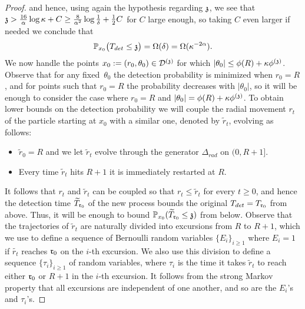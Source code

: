 \begin{proof}
and hence, using again the hypothesis regarding $\ss$, we see that $\ss>\frac{16}{\alpha}\log\kappa+C\geq \frac{8}{\alpha^2}\log\frac{1}{\delta}+\frac12 C$ for $C$ large enough, so taking $C$ even larger if needed we conclude that 
\[%
\P_{x_0}\big(T_{det}\leq \ss\big)=\Omega(\delta)=\Omega(\kappa^{-2\alpha}).
\]
We now handle the points $x_0:=(r_0,\theta_0)\in\dt$ for which $|\theta_0|\leq\phi(R)+\kappa\phi^{(\ss)}$. Observe that for any fixed~$\theta_0$ the detection probability is minimized when $r_0=R$, and for points such that $r_0=R$ the probability decreases with $|\theta_0|$, so it will be enough to consider the case where $r_0=R$ and $|\theta_0|=\phi(R)+\kappa\phi^{(\ss)}$. To obtain lower bounds on the detection probability we will couple the radial movement $r_t$ of the particle starting at $x_0$ with a similar one, denoted by $\widetilde{r}_t$, evolving as follows:
\begin{itemize}
    \item $\widetilde{r}_0=R$ and we let $\widetilde{r}_t$ evolve through the generator $\Delta_{rad}$ on $(0,R+1]$.
    \item Every time $\widetilde{r}_t$ hits $R+1$ it is immediately restarted at $R$.
\end{itemize}
It follows that $r_t$ and $\widetilde{r}_t$ can be coupled so that $r_t\leq\widetilde{r}_t$ for every $t\geq0$, and hence the detection time $\widetilde{T}_{\rabs_0}$ of the new process bounds the original $T_{det}=T_{\rabs_0}$ from above. Thus, it will be enough to bound $\PP_{x_0}(\widetilde{T}_{\rabs_0}\leq\ss)$ from below. Observe that the trajectories of $\widetilde{r}_t$ are naturally divided into excursions from $R$ to $R+1$, which we use to define a sequence of Bernoulli random variables $\{E_i\}_{i\geq1}$ where $E_i=1$ if $\widetilde{r_t}$ reaches $\rabs_0$ on the $i$-th excursion. We also use this division to define a sequence $\{\tau_i\}_{i\geq1}$ of random variables, where $\tau_i$ is the time it takes $\widetilde{r}_t$ to reach either $\rabs_0$ or $R+1$ in the $i$-th excursion. It follows from the strong Markov property that all excursions are independent of one another, and so are the $E_i$'s and $\tau_i$'s.


\end{proof}
